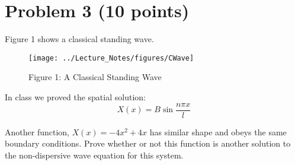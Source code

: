 \documentclass[10pt, letterpaper]{memoir}
\begin{document}
	\section*{Problem 3 (10 points)}
	Figure 1 shows a classical standing wave. 
	\begin{figure}[h]
		\centering
		\texttt{[image: ../Lecture\_Notes/figures/CWave]}
		
		Figure 1: A Classical Standing Wave
		\label{fig:cwave}
	\end{figure}
	
	In class we proved the spatial solution:
	\begin{equation*}
	X(x) = B\sin{\frac{n\pi x}{l}}
	\end{equation*}
		
	
	
	Another function, $X(x) = -4x^2+4x$ has similar shape and obeys the same boundary conditions. Prove whether or not this function is another solution to the non-dispersive wave equation for this system.

	
\end{document}

